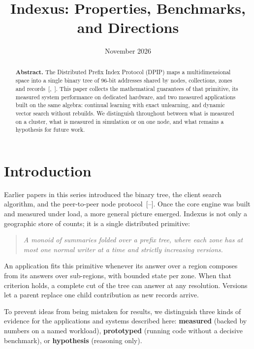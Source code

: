 \documentclass[11pt]{article}
\begin{document}
\title{Indexus: Properties, Benchmarks, and Directions}
\author{\ixbyline}
\date{November 2026}
\maketitle

\begin{abstract}
\noindent \textbf{Abstract. }The Distributed Prefix Index Protocol (DPIP) maps a multidimensional space into a single binary tree of 96-bit addresses shared by nodes, collections, zones and records~[,~]. This paper collects the mathematical guarantees of that primitive, its measured system performance on dedicated hardware, and two measured applications built on the same algebra: continual learning with exact unlearning, and dynamic vector search without rebuilds. We distinguish throughout between what is measured on a cluster, what is measured in simulation or on one node, and what remains a hypothesis for future work.
\vspace{1em}\end{abstract}

\section{Introduction}
Earlier papers in this series introduced the binary tree, the client search algorithm, and the peer-to-peer node protocol~[--]. Once the core engine was built and measured under load, a more general picture emerged. Indexus is not only a geographic store of counts; it is a single distributed primitive:
\begin{quote}
\emph{A monoid of summaries folded over a prefix tree, where each zone has at most one normal writer at a time and strictly increasing versions.}
\end{quote}

An application fits this primitive whenever its answer over a region composes from its answers over sub-regions, with bounded state per zone. When that criterion holds, a complete cut of the tree can answer at any resolution. Versions let a parent replace one child contribution as new records arrive.

To prevent ideas from being mistaken for results, we distinguish three kinds of evidence for the applications and systems described here: \textbf{measured} (backed by numbers on a named workload), \textbf{prototyped} (running code without a decisive benchmark), or \textbf{hypothesis} (reasoning only).
\end{document}
